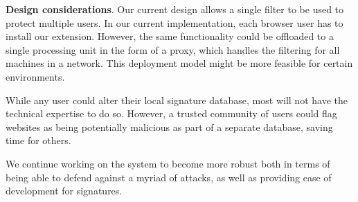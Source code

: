 \textbf{Design considerations}. Our current design allows a single filter to be used to protect multiple users. In our current implementation, each browser user has to install our extension. However, the same functionality could be offloaded to a single processing unit in the form of a proxy, which handles the filtering for all machines in a network. This deployment model might be more feasible for certain environments.

While any user could alter their local signature database, most will not have the technical expertise to do so. However, a trusted community of users could flag websites as being potentially malicious as part of a separate database, saving time for others. 

We continue working on the system to become more robust both in terms of being able to defend against a myriad of attacks, as well as providing ease of development for signatures. 
